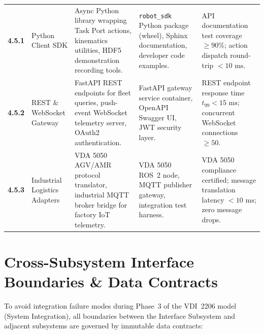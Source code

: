 \documentclass[10pt,a4paper]{article}
\begin{document}
\begin{small}
\begin{longtable}{@{}p{} p{} p{} p{} p{}@{}}
\textbf{4.5.1} & 
Python Client SDK & 
Async Python library wrapping Task Port actions, kinematics utilities, HDF5 demonstration recording tools. & 
\texttt{robot\_sdk} Python package (wheel), Sphinx documentation, developer code examples. & 
API documentation test coverage $\ge 90\%$; action dispatch round-trip $<10\text{ ms}$. \\
\addlinespace[3pt]

\textbf{4.5.2} & 
REST \& WebSocket Gateway & 
FastAPI REST endpoints for fleet queries, push-event WebSocket telemetry server, OAuth2 authentication. & 
FastAPI gateway service container, OpenAPI Swagger UI, JWT security layer. & 
REST endpoint response time $t_{99} < 15\text{ ms}$; concurrent WebSocket connections $\ge 50$. \\
\addlinespace[3pt]

\textbf{4.5.3} & 
Industrial Logistics Adapters & 
VDA 5050 AGV/AMR protocol translator, industrial MQTT broker bridge for factory IoT telemetry. & 
VDA 5050 ROS~2 node, MQTT publisher gateway, integration test harness. & 
VDA 5050 compliance certified; message translation latency $<10\text{ ms}$; zero message drops. \\

\end{longtable}
\end{small}

\section{Cross-Subsystem Interface Boundaries \& Data Contracts}
\label{sec:interfaces}

To avoid integration failure modes during Phase~3 of the VDI~2206 model (System Integration), all boundaries between the Interface Subsystem and adjacent subsystems are governed by immutable data contracts:
\end{document}
